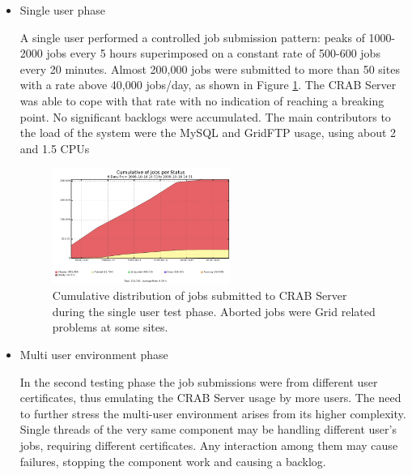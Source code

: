 \begin{itemize}
\item{   Single user phase}

A single user performed a controlled job submission pattern: peaks of
1000-2000 jobs every 5 hours superimposed on a constant rate of
500-600 jobs every 20 minutes. Almost 200,000 jobs were submitted to
more than 50 sites with a rate above 40,000 jobs/day, as shown in
Figure \ref{fig:stresssingle}. The CRAB Server was able to cope with that
rate with no indication of reaching a breaking point. No significant
backlogs were accumulated. The main contributors to the load of the
system were the MySQL and GridFTP usage, using about 2 and 1.5 CPUs
\begin{figure}
\includegraphics[width=0.55\textwidth]{figures/SingleUserJobStatus.png}
\caption{Cumulative distribution of jobs submitted to CRAB Server
  during the single user test phase. Aborted jobs were Grid related
  problems at some sites. }
\label{fig:stresssingle}
\end{figure}

\item{    Multi user environment phase}

In the second testing phase the job submissions were from different
user certificates, thus emulating the CRAB Server usage by more
users. The need to further stress the multi-user environment arises
from its higher complexity. Single threads of the very same component
may be handling different user's jobs, requiring different
certificates. Any interaction among them may cause failures, stopping
the component work and causing a backlog.


\end{itemize}
